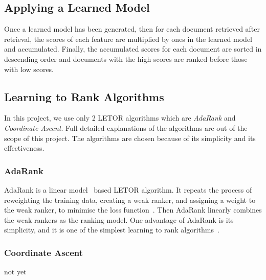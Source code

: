 \subsection{Applying a Learned Model}\label{sec:background_applyLearnedModel}
Once a learned model has been generated, then for each document retrieved after retrieval, 
the scores of each feature are multiplied by ones in the learned model and accumulated.
Finally, the accumulated scores for each document are sorted in descending order and documents with the high scores are ranked before
those with low scores.

\subsection{Learning to Rank Algorithms}
In this project, we use only 2 LETOR algorithms which are \textit{AdaRank} and \textit{Coordinate Ascent}. Full detailed explanations of the algorithms 
are out of the scope of this project. The algorithms are chosen because of its simplicity and its effectiveness.

\subsubsection{AdaRank}
AdaRank is a linear model~\cite[P. 1-4]{mlSimon} based LETOR algorithm.
It repeats the process of reweighting the training data, creating a weak ranker, and assigning a weight to the weak ranker, to minimise the loss 
function~\cite[P. 60]{letorBook}. Then AdaRank linearly combines the weak rankers as the ranking model. One advantage of AdaRank is its simplicity, and it is one of the simplest
learning to rank algorithms~\cite[P. 60]{letorBook}.

\subsubsection{Coordinate Ascent}
not yet

